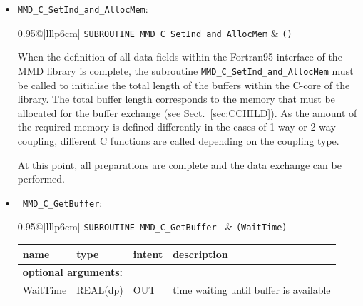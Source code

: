 \documentclass[twoside]{article}
\begin{document}
\begin{itemize}
\item  \verb|MMD_C_SetInd_and_AllocMem|:\\
\vspace*{-0.3cm}

\begin{tabular*}{0.95\textwidth}{@{\extracolsep\fill}|lllp{6cm}|}
\hline
{}
{\tt SUBROUTINE MMD\_C\_SetInd\_and\_AllocMem} &
{\tt ()}\\
\hline
\end{tabular*}
\smallskip
\vspace*{-0.3cm}

When the definition of all data fields within the Fortran95 interface of the
MMD library is complete, the
subroutine \verb|MMD_C_SetInd_and_AllocMem| must be called to
initialise the total length of the buffers within the C-core of the
library. The total buffer 
length corresponds to the memory that must be allocated for the buffer exchange
 (see Sect.\ \ref{sec:CCHILD}).
As the amount of the required memory is defined differently in the
cases of 1-way or 2-way coupling, different C functions are called
depending on the coupling type. 

At this point, all preparations are complete and the data exchange can be 
performed.
 
\item  \verb| MMD_C_GetBuffer|:\\
\vspace*{-0.3cm}

\begin{tabular*}{0.95\textwidth}{@{\extracolsep\fill}|lllp{6cm}|}
\hline
{}
{\tt SUBROUTINE MMD\_C\_GetBuffer } &
{\tt (WaitTime)}\\
\hline
\end{tabular*}
\begin{tabular*}{0.95\textwidth}{@{\extracolsep\fill}|lllp{6.5cm}|}
name & type & intent & description\\
\hline
\multicolumn{4}{|l|}{\bf optional arguments:}\\
WaitTime & REAL(dp) & OUT & time waiting until buffer is available \\
\hline
\end{tabular*}
\smallskip


\end{itemize}
\end{document}
